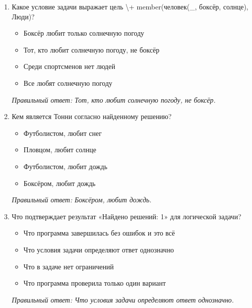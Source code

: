 \begin{enumerate}[label=\textbf{\arabic*.}, leftmargin=0pt, itemsep=1.2em]
\item Какое условие задачи выражает цель \textbackslash{}+ member(человек(\_, боксёр, солнце), Люди)?
\begin{itemize}[label=$\square$, leftmargin=1.5cm, itemsep=0.2em, topsep=0.3em]
\item Боксёр любит только солнечную погоду
\item Тот, кто любит солнечную погоду, не боксёр
\item Среди спортсменов нет людей
\item Все любят солнечную погоду
\end{itemize}
{\small\textit{Правильный ответ: Тот, кто любит солнечную погоду, не боксёр.}}

\item Кем является Тонни согласно найденному решению?
\begin{itemize}[label=$\square$, leftmargin=1.5cm, itemsep=0.2em, topsep=0.3em]
\item Футболистом, любит снег
\item Пловцом, любит солнце
\item Футболистом, любит дождь
\item Боксёром, любит дождь
\end{itemize}
{\small\textit{Правильный ответ: Боксёром, любит дождь.}}

\item Что подтверждает результат «Найдено решений: 1» для логической задачи?
\begin{itemize}[label=$\square$, leftmargin=1.5cm, itemsep=0.2em, topsep=0.3em]
\item Что программа завершилась без ошибок и это всё
\item Что условия задачи определяют ответ однозначно
\item Что в задаче нет ограничений
\item Что программа проверила только один вариант
\end{itemize}
{\small\textit{Правильный ответ: Что условия задачи определяют ответ однозначно.}}
\end{enumerate}
\normalsize
